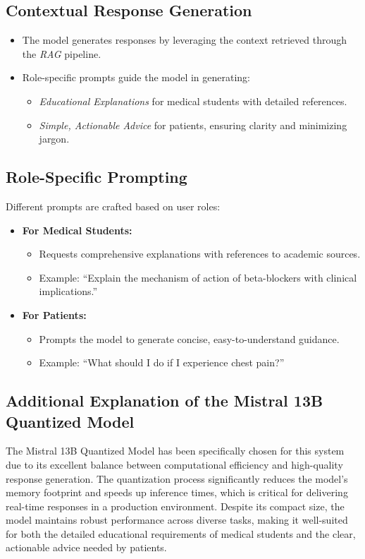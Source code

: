 \subsection{Contextual Response Generation}
\label{subsec:mistral_response}
\begin{itemize}
    \item The model generates responses by leveraging the context retrieved through the \emph{RAG} pipeline.
    \item Role-specific prompts guide the model in generating:
        \begin{itemize}
            \item \emph{Educational Explanations} for medical students with detailed references.
            \item \emph{Simple, Actionable Advice} for patients, ensuring clarity and minimizing jargon.
        \end{itemize}
\end{itemize}

\subsection{Role-Specific Prompting}
\label{subsec:mistral_prompting}
Different prompts are crafted based on user roles:
\begin{itemize}
    \item \textbf{For Medical Students:}
        \begin{itemize}
            \item Requests comprehensive explanations with references to academic sources.
            \item Example: “Explain the mechanism of action of beta-blockers with clinical implications.”
        \end{itemize}
    \item \textbf{For Patients:}
        \begin{itemize}
            \item Prompts the model to generate concise, easy-to-understand guidance.
            \item Example: “What should I do if I experience chest pain?”
        \end{itemize}
\end{itemize}

\subsection{Additional Explanation of the Mistral 13B Quantized Model}
\label{subsec:mistral_explanation}
The Mistral 13B Quantized Model has been specifically chosen for this system due to its excellent balance between computational efficiency and high-quality response generation. The quantization process significantly reduces the model’s memory footprint and speeds up inference times, which is critical for delivering real-time responses in a production environment. Despite its compact size, the model maintains robust performance across diverse tasks, making it well-suited for both the detailed educational requirements of medical students and the clear, actionable advice needed by patients.

